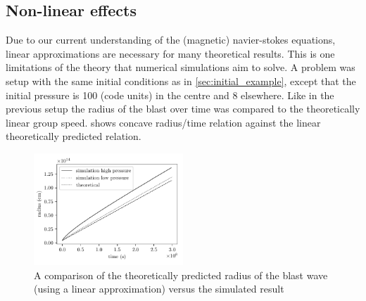 \documentclass[a4paper]{article}
\begin{document}
\subsection{Non-linear effects} \label{sec:nonlinear_effects}
Due to our current understanding of the (magnetic) navier-stokes equations, linear approximations are necessary for many theoretical results. 
This is one limitations of the theory that numerical simulations aim to solve.
A problem was setup with the same initial conditions as in \cref{sec:initial_example}, except that the initial pressure is 100 (code units) in the centre and 8 elsewhere. 
Like in the previous setup the radius of the blast over time was compared to the theoretically linear group speed.
 shows concave radius/time relation against the linear theoretically predicted relation. 
\begin{figure}[h]
	\centering
	\includegraphics[width=0.5\textwidth]{figures/non_linear_effects.pdf}
	\caption{A comparison of the theoretically predicted radius of the blast wave (using a linear approximation) versus the simulated result}
	\label{fig:non_linear_effects}
\end{figure}
\end{document}
